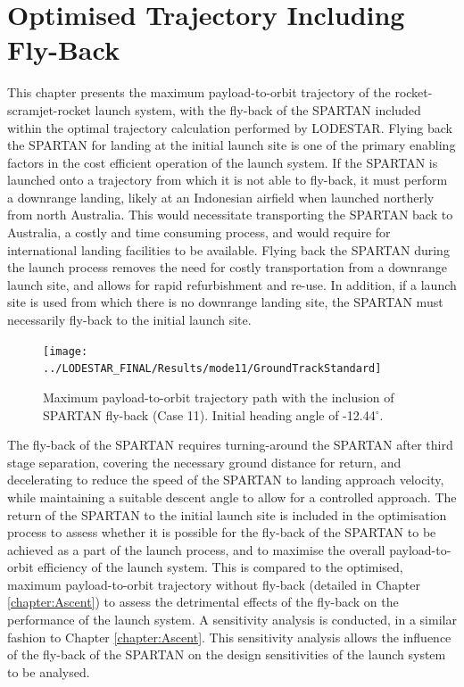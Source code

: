 
\cleardoublepage
\chapter{Optimised Trajectory Including Fly-Back}\label{chapter:Flyback}

This chapter presents the maximum payload-to-orbit trajectory of the rocket-scramjet-rocket launch system, with the fly-back of the SPARTAN included within the optimal trajectory calculation performed by LODESTAR. 
Flying back the SPARTAN for landing at the initial launch site is one of the primary enabling factors in the cost efficient operation of the launch system. If the SPARTAN is launched onto a trajectory from which it is not able to fly-back, it must perform a downrange landing, likely at an Indonesian airfield when launched northerly from north Australia. This would necessitate transporting the SPARTAN back to Australia, a costly and time consuming process, and would require for international landing facilities to be available. 
Flying back the SPARTAN during the launch process removes the need for costly transportation from a downrange launch site, and allows for rapid refurbishment and re-use.
In addition, if a launch site is used from which there is no downrange landing site, the SPARTAN must necessarily fly-back to the initial launch site. 


\begin{figure}[ht]
	\centering
	\texttt{[image: ../LODESTAR\_FINAL/Results/mode11/GroundTrackStandard]}
	\caption{Maximum payload-to-orbit trajectory path with the inclusion of SPARTAN fly-back (Case 11). Initial heading angle of -12.44$^\circ$.}
	\label{fig:GroundTrackStandard}
\end{figure}

The fly-back of the SPARTAN requires turning-around the SPARTAN after third stage separation, covering the necessary ground distance for return, and decelerating to reduce the speed of the SPARTAN to landing approach velocity, while maintaining a suitable descent angle to allow for a controlled approach. 
The return of the SPARTAN to the initial launch site is included in the optimisation process to assess whether it is possible for the fly-back of the SPARTAN to be achieved as a part of the launch process, and to maximise the overall payload-to-orbit efficiency of the launch system. This is compared to the optimised, maximum payload-to-orbit trajectory without fly-back (detailed in Chapter \ref{chapter:Ascent}) to assess the detrimental effects of the fly-back on the performance of the launch system. 
A sensitivity analysis is conducted, in a similar fashion to Chapter \ref{chapter:Ascent}. 
This sensitivity analysis allows the influence of the fly-back of the SPARTAN on the design sensitivities of the launch system to be analysed.


